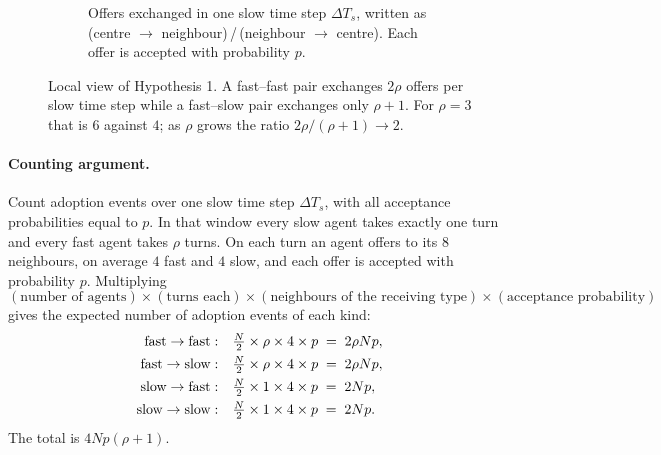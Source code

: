 \documentclass{article}
\newcommand{\dTs}{\Delta T_s}
\begin{document}
\begin{figure}[ht]
\begin{subfigure}[b]{0.58\textwidth}
        \caption{Offers exchanged in one slow time step $\dTs$, written as (centre $\to$ neighbour)\,/\,(neighbour $\to$ centre). Each offer is accepted with probability $p$.}
        \label{fig:h1b}
    \end{subfigure}
    \caption{Local view of Hypothesis 1. A fast--fast pair exchanges $2\rho$ offers per slow time step while a fast--slow pair exchanges only $\rho+1$. For $\rho = 3$ that is $6$ against $4$; as $\rho$ grows the ratio $2\rho/(\rho+1) \to 2$.}
    \label{fig:h1}
\end{figure}

\paragraph{Counting argument.} Count adoption events over one slow time step $\dTs$, with all acceptance probabilities equal to $p$. In that window every slow agent takes exactly one turn and every fast agent takes $\rho$ turns. On each turn an agent offers to its $8$ neighbours, on average $4$ fast and $4$ slow, and each offer is accepted with probability $p$. Multiplying
\[
(\text{number of agents}) \times (\text{turns each}) \times (\text{neighbours of the receiving type}) \times (\text{acceptance probability})
\]
gives the expected number of adoption events of each kind:
\begin{align}
\text{fast} \to \text{fast}: &\quad \tfrac{N}{2} \times \rho \times 4 \times p \;=\; 2\rho N p, \notag\\
\text{fast} \to \text{slow}: &\quad \tfrac{N}{2} \times \rho \times 4 \times p \;=\; 2\rho N p, \notag\\
\text{slow} \to \text{fast}: &\quad \tfrac{N}{2} \times 1 \times 4 \times p \;=\; 2 N p, \notag\\
\text{slow} \to \text{slow}: &\quad \tfrac{N}{2} \times 1 \times 4 \times p \;=\; 2 N p.
\label{eq:counts}
\end{align}
The total is $4Np(\rho+1)$.
\end{document}
